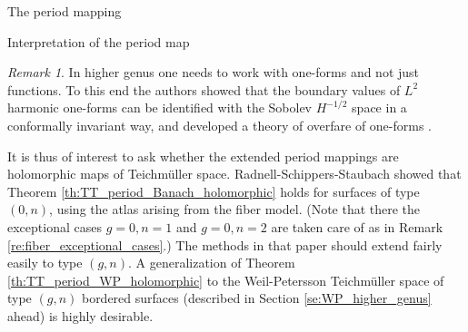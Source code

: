 \documentclass[12pt]{amsart}
\theoremstyle{plain}
\theoremstyle{definition}
\theoremstyle{remark}
\newtheorem{remark}[theorem]{Remark}
\numberwithin{equation}{section} %
\numberwithin{figure}{section} %
\begin{document}
\begin{section}{The period mapping}
\begin{subsection}{Interpretation of the period map}
\begin{remark} 
 In higher genus one needs to work with one-forms and not just functions. To this end the authors showed that the boundary values of $L^2$ harmonic one-forms can be identified with the Sobolev $H^{-1/2}$ space in a conformally invariant way, and developed a theory of overfare of one-forms \cite{Schippers_Staubach_scattering,Schipp-Staub-Kenig}.
\end{remark}
  


 It is thus of interest to ask whether the extended period mappings are holomorphic maps of Teichm\"uller space. Radnell-Schippers-Staubach \cite{RSS_period_genuszero} showed that Theorem \ref{th:TT_period_Banach_holomorphic} holds for surfaces of type $(0,n)$, using the atlas arising from the fiber model. (Note that there the exceptional cases $g=0, n=1$ and $g=0, n=2$ are taken care of as in Remark \ref{re:fiber_exceptional_cases}.) The methods in that paper should extend fairly easily to type $(g,n)$. A generalization of Theorem \ref{th:TT_period_WP_holomorphic} to the Weil-Petersson Teichm\"uller space  of type $(g,n)$ bordered surfaces (described in Section \ref{se:WP_higher_genus} ahead) is highly desirable. 
\end{subsection}     
\end{section}
\end{document}
